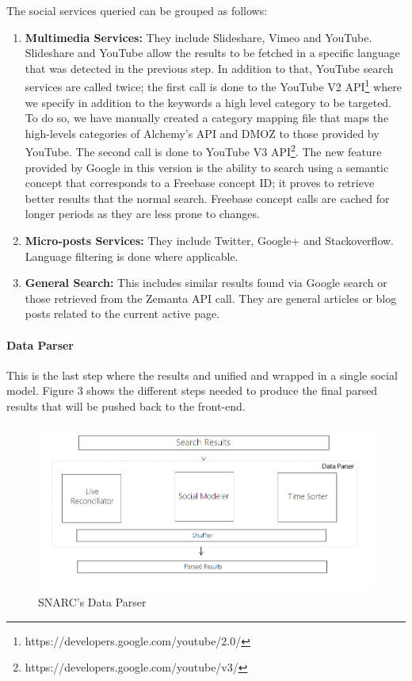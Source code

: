 \documentclass[onecolumn, crcready]{iosart2c}
\begin{document}
The social services queried can be grouped as follows:
\begin{enumerate}
\item {\bf Multimedia Services:} They include Slideshare, Vimeo and YouTube. Slideshare and YouTube allow the results to be fetched in a specific language that was detected in the previous step. In addition to that, YouTube search services are called twice; the first call is done to the YouTube V2 API\footnote{https://developers.google.com/youtube/2.0/} where we specify in addition to the keywords a high level category to be targeted. To do so, we have manually created a category mapping file that maps the high-levels categories of Alchemy’s API and DMOZ to those provided by YouTube. The second call is done to YouTube V3 API\footnote{https://developers.google.com/youtube/v3/}. The new feature provided by Google in this version is the ability to search using a semantic concept that corresponds to a Freebase concept ID; it proves to retrieve better results that the normal search. Freebase concept calls are cached for longer periods as they are less prone to changes. 
\item {\bf Micro-posts Services:} They include Twitter, Google+ and Stackoverflow. Language filtering is done where applicable. 
\item {\bf General Search:} This includes similar results found via Google search or those retrieved from the Zemanta API call. They are general articles or blog posts related to the current active page.
\end{enumerate}
\paragraph{Data Parser}
This is the last step where the results and unified and wrapped in a single social model. Figure 3 shows the different steps needed to produce the final parsed results that will be pushed back to the front-end.
\begin{figure}[ht!]
  \centering
    \includegraphics[scale=0.5]{architecture-part3.png} 
  \caption{SNARC's Data Parser}
\end{figure}
\end{document}
